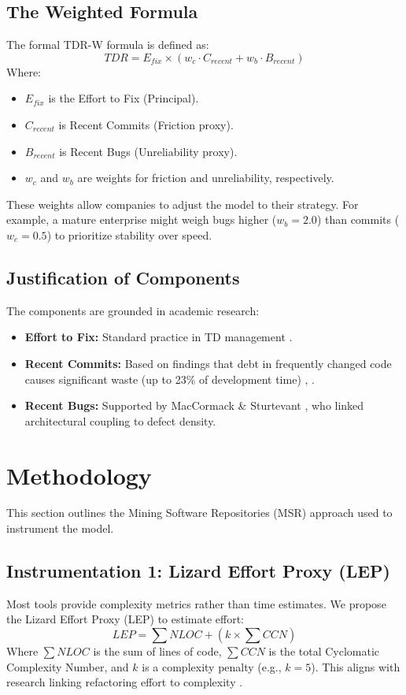 \documentclass[conference]{IEEEtran}
\begin{document}
\subsection{The Weighted Formula}
The formal TDR-W formula is defined as:
\begin{equation}
TDR = E_{fix} \times (w_c \cdot C_{recent} + w_b \cdot B_{recent})
\label{eq1}
\end{equation}
Where:
\begin{itemize}
    \item $E_{fix}$ is the Effort to Fix (Principal).
    \item $C_{recent}$ is Recent Commits (Friction proxy).
    \item $B_{recent}$ is Recent Bugs (Unreliability proxy).
    \item $w_c$ and $w_b$ are weights for friction and unreliability, respectively.
\end{itemize}

These weights allow companies to adjust the model to their strategy. For example, a mature enterprise might weigh bugs higher ($w_b=2.0$) than commits ($w_c=0.5$) to prioritize stability over speed.

\subsection{Justification of Components}
The components are grounded in academic research:
\begin{itemize}
    \item \textbf{Effort to Fix:} Standard practice in TD management \cite{b7}.
    \item \textbf{Recent Commits:} Based on findings that debt in frequently changed code causes significant waste (up to 23\% of development time) \cite{b8}, \cite{b2}.
    \item \textbf{Recent Bugs:} Supported by MacCormack \& Sturtevant \cite{b13}, who linked architectural coupling to defect density.
\end{itemize}

\section{Methodology}
This section outlines the Mining Software Repositories (MSR) approach used to instrument the model.

\subsection{Instrumentation 1: Lizard Effort Proxy (LEP)}
Most tools provide complexity metrics rather than time estimates. We propose the Lizard Effort Proxy (LEP) to estimate effort:
\begin{equation}
LEP = \sum NLOC + (k \times \sum CCN)
\label{eq2}
\end{equation}
Where $\sum NLOC$ is the sum of lines of code, $\sum CCN$ is the total Cyclomatic Complexity Number, and $k$ is a complexity penalty (e.g., $k=5$). This aligns with research linking refactoring effort to complexity \cite{b7}.
\end{document}
